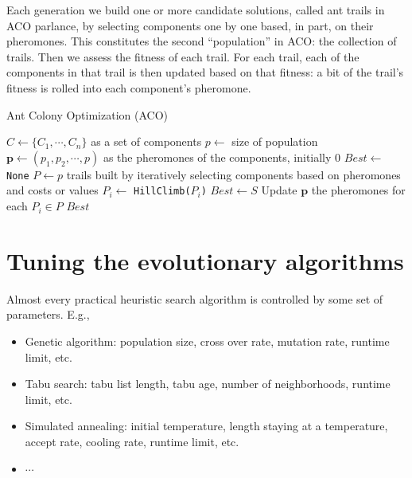             Each generation we build one or more candidate solutions, called ant trails in ACO parlance, by selecting components one by one based, in part, on their pheromones. This constitutes the second ``population'' in ACO: the collection of trails. Then we assess the fitness of each trail. For each trail, each of the components in that trail is then updated based on that fitness: a bit of the trail’s fitness is rolled into each component’s pheromone.

            \begin{algorithm}[!htp]
                \centering
                \caption{Ant Colony Optimization (ACO)}
                \begin{algorithmic}[1]
                    \State $C \gets \{C_1, \cdots, C_n\}$ as a set of components
                    \State $p \gets$ size of population
                    \State $\mathbf{p} \gets (p_1, p_2, \cdots, p)$ as the pheromones of the components, initially 0
                    \State $Best \gets$ \texttt{None}
                        \State $P \gets p$ trails built by iteratively selecting components based on pheromones and costs or values
                            \State $P_i \gets$ \texttt{HillClimb($P_i$)}
                                \State $Best \gets S$
                            \EndIf
                        \EndFor
                        \State Update $\mathbf{p}$ the pheromones for each $P_i \in P$
                    \EndWhile
                    \State \Return $Best$
                \end{algorithmic}
            \end{algorithm}

    \section{Tuning the evolutionary algorithms}
        Almost every practical heuristic search algorithm is controlled by some set of parameters. E.g.,

        \begin{itemize}
            \item Genetic algorithm: population size, cross over rate, mutation rate, runtime limit, etc.
            \item Tabu search: tabu list length, tabu age, number of neighborhoods, runtime limit, etc.
            \item Simulated annealing: initial temperature, length staying at a temperature, accept rate, cooling rate, runtime limit, etc.
            \item $\cdots$
        \end{itemize}

